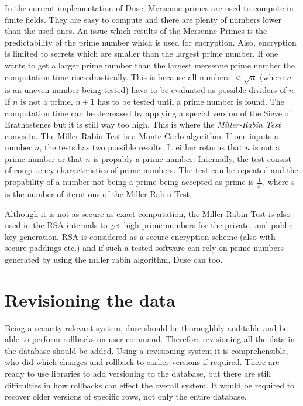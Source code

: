 In the current implementation of Duse, Mersenne primes are used to
compute in finite fields. They are easy to compute and there are
plenty of numbers lower than the used ones. An issue which results
of the Mersenne Primes is the predictability of the prime number
which is used for encryption. Also, encryption is limited to secrets
which are smaller than the largest prime number. If one wants to
get a larger prime number than the largest mersenne prime number the
computation time rises drastically. This is because all numbers
$< \sqrt{n}$ (where $n$ is an uneven number being tested) have to be evaluated
as possible dividers of $n$. If $n$ is not a prime, $n+1$ has to be
tested until a prime number is found. The computation time can be
decreased by applying a special version of the Sieve of Erathostenes but
it is still way too high. This is where the \textit{Miller-Rabin Test}
comes in. The Miller-Rabin Test is a Monte-Carlo algorithm. If one inputs
a number $n$, the tests has two possible results: It either returns
that $n$ is not a prime number or that $n$ is propably a prime number.
Internally, the test consist of congruency characteristics of prime numbers.
The test can be repeated and the propability of a number not being a
prime being accepted as prime is $\frac{1}{4^s}$, where s is the number
of iterations of the Miller-Rabin Test.

Although it is not as secure as exact computation, the Miller-Rabin Test
is also used in the RSA internals to get high prime numbers for the
private- and public key generation. RSA is considered as a secure
encryption scheme (also with secure paddings etc.) and if such a tested
software can rely on prime numbers generated by using the miller rabin
algorithm, Duse can too.

\section{Revisioning the data}

Being a security relevant system, duse should be thoroughbly auditable and be
able to perform rollbacks on user command. Therefore revisioning all the data
in the database should be added. Using a revisioning system it is
comprehensible, who did which changes and rollback to earlier versions if
required. There are ready to use libraries to add versioning to the database,
but there are still difficulties in how rollbacks can effect the overall
system. It would be required to recover older versions of specific rows, not
only the entire database.


